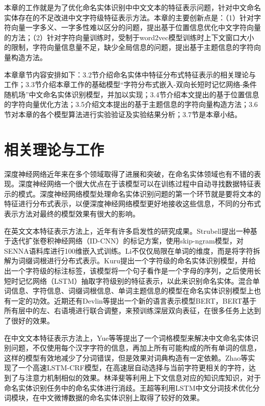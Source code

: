 \documentclass[winfonts,master,oneside,nobackinfo]{njuthesis}
\begin{document}
本章的工作就是为了优化命名实体识别中中文文本的特征表示问题，针对中文命名实体存在的不足改进中文字符级特征表示方法。本章的主要创新点是：（1）针对字符向量一字多义、一字多性难以区分的问题，提出基于位置信息优化中文字符向量的方法；（2）针对字符向量训练时，受制于word2vec模型训练时上下文窗口大小的限制，字符向量信息量不足，缺少全局信息的问题，提出基于主题信息的字符向量构造方法。

本章章节内容安排如下：3.2节介绍命名实体中特征分布式特征表示的相关理论与工作；3.3节介绍本章工作的基础模型“字符分布式嵌入-双向长短时记忆网络-条件随机场”中文命名实体识别模型，并加以实现；3.4节介绍本文提出的基于位置信息的字符向量优化方法；3.5介绍文本提出的基于主题信息的字符向量构造方法；3.6节对本章的各个模型算法进行实验验证及实验结果分析；3.7节是本章小结。

\section{相关理论与工作}

深度神经网络近年来在多个领域取得了进展和突破，在命名实体领域也有不错的表现。深度神经网络一个很大优点在于该模型可以在训练过程中自动寻找数据特征表示的模式。深度神经网络模型处理命名实体识别问题的第一个环节就是要将文本的特征进行分布式表示，以便深度神经网络模型更好地接收这些信息，不同的分布式表示方法对最终的模型效果有很大的影响。

在英文文本特征表示方法上，近年有许多启发性的研究成果。Strubell\cite{Strubell}提出一种基于迭代扩张卷积神经网络（ID-CNN）的标记方案，使用skip-ngram模型，对SENNA语料库进行100维嵌入式训练。Li\cite{JLi}不仅仅局限在单词的维度，而是将字符拆解为词缀词根进行分布式表示。Kuru\cite{Kuru}提出一个字符级的命名实体识别模型，并给出一个字符级的标注标签，该模型将一个句子看作是一个字母的序列，之后使用长短时记忆网络（LSTM）抽取字符级别的特征表示，以此来识别命名实体。混合单词信息、字符信息、词缀词根信息、单词主题信息的模型\cite{Strubell,Jansson,Wei}在命名实体识别模型上也有一定的功效。近期还有Devlin等\cite{Devlin}提出一个新的语言表示模型BERT，BERT基于所有层中的左、右语境进行联合调整，来预训练深层双向表征，在很多任务上达到了很好的效果。

在中文文本特征表示方法上，Yue等\cite{Yue}等提出了一个词格模型来解决中文命名实体识别问题，不仅使用每个汉字字符的信息，再加上所有可能构成的所有单词的信息，这样的模型有效地减少了分词错误，但是效果对词典构造有一定依赖。Zhao等\cite{Zhao}实现了一个高速LSTM-CRF模型，在高速层自动选择与当前字符更相关的字符，达到了与注意力机制相似的效果。林泽斐等\cite{lzf}利用上下文信息对应的知识库知识，对于命名实体识别任务中的命名实体进行消歧。王超等\cite{Wang}利用LSTM中文分词技术优化分词模块，在中文微博数据的命名实体识别上取得了较好的效果。
\end{document}
